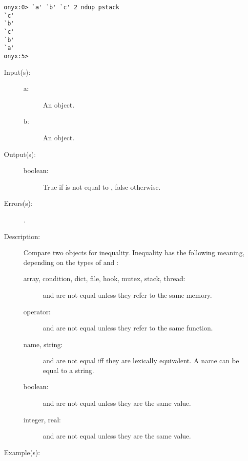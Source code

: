\begin{description}
\begin{description}
\begin{verbatim}
onyx:0> `a' `b' `c' 2 ndup pstack
`c'
`b'
`c'
`b'
`a'
onyx:5>
		\end{verbatim}
	\end{description}
\label{systemdict:ne}
\item[{\onyxop{a b}{ne}{boolean}}: ]
	\begin{description}\item[]
	\item[Input(s): ]
		\begin{description}\item[]
		\item[a: ]
			An object.
		\item[b: ]
			An object.
		\end{description}
	\item[Output(s): ]
		\begin{description}\item[]
		\item[boolean: ]
			True if  is not equal to , false
			otherwise.
		\end{description}
	\item[Errors(s): ]
		\begin{description}\item[]
		\item[.]
		\end{description}
	\item[Description: ]
		Compare two objects for inequality.  Inequality has the
		following meaning, depending on the types of  and
		:
		\begin{description}
		\item[array, condition, dict, file, hook, mutex, stack,
		thread: ]  and  are not equal unless they
		refer to the same memory.
		\item[operator: ]  and  are not equal unless
		they refer to the same function.
		\item[name, string: ]  and  are not equal iff
		they are lexically equivalent.  A name can be equal to a string.
		\item[boolean: ]  and  are not equal unless
		they are the same value.
		\item[integer, real: ]  and  are not equal
		unless they are the same value.
		\end{description}
	\item[Example(s): ]\begin{verbatim}


\end{verbatim}
\end{description}
\end{description}
